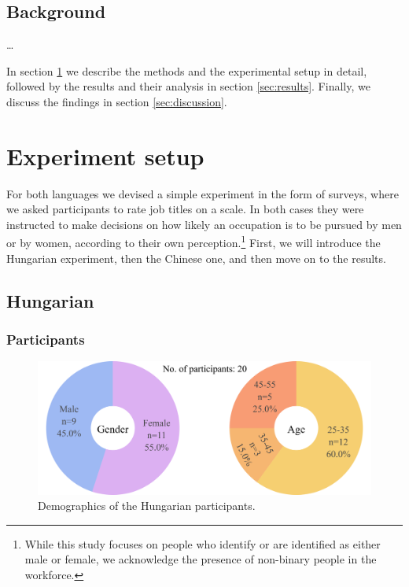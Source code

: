 \documentclass[11pt]{article}
\newcommand{\zh}[1]{\simplifiedchinesefont{#1}\rmfamily}
\begin{document}
\subsection{Background}



\dots

In section \ref{sec:experiment_setup} we describe the methods and the experimental setup in detail, followed by the results and their analysis in section \ref{sec:results}. Finally, we discuss the findings in section \ref{sec:discussion}.

\section{Experiment setup}\label{sec:experiment_setup}

For both languages we devised a simple experiment in the form of surveys, where we asked participants to rate job titles on a scale. In both cases they were instructed to make decisions on how likely an occupation is to be pursued by men or by women, according to their own perception.\footnote{While this study focuses on people who identify or are identified as either male or female, we acknowledge the presence of non-binary people in the workforce.} First, we will introduce the Hungarian experiment, then the Chinese one, and then move on to the results.



\subsection{Hungarian}

\subsubsection{Participants}

\begin{figure}[!ht]
  \centering
  \includegraphics[width=\linewidth]{../demographics_hu}
  \caption{Demographics of the Hungarian participants.}
  \label{fig:demographics_hu}
\end{figure}
\end{document}
